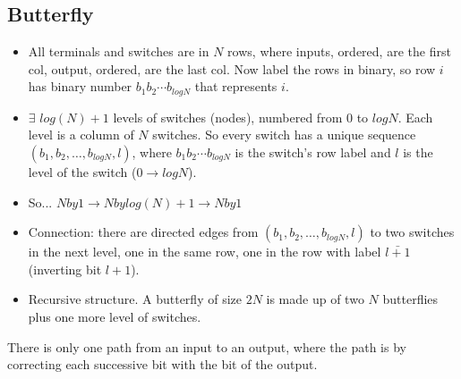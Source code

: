 \documentclass[10pt]{article}
\newcommand{\ra}{\rightarrow}
\begin{document}
\subsection{Butterfly}
\label{sec:butterfly}

\begin{itemize}
\item All terminals and switches are in $N$ rows, where inputs,
  ordered, are the first col, output, ordered, are the last col. Now
  label the rows in binary, so row $i$ has binary number
  $b_1b_2\cdots b_{logN}$ that represents $i$.
\item $\exists$ $log(N) + 1$ levels of switches (nodes), numbered from
  $0$ to $logN$. Each level is a column of $N$ switches. So every
  switch has a unique sequence $(b_1, b_2, \dots, b_{logN}, l)$, where
  $b_1b_2\cdots b_{logN}$ is the switch's row label and $l$ is the
  level of the switch ($0\ra logN$).
\item So... $Nby1\ra Nbylog(N)+1 \ra Nby1$
\item Connection: there are directed edges from $(b_1, b_2, \dots,
  b_{logN}, l)$ to two switches in the next level, one in the same
  row, one in the row with label $\bar{l+1}$ (inverting bit $l+1$).
\item Recursive structure. A butterfly of size $2N$ is made up of two
 $N$  butterflies plus one more level of switches. 
\end{itemize} There is only one path from an input to an output, where the path is by correcting each
successive bit with the bit of the output.\\
\end{document}
